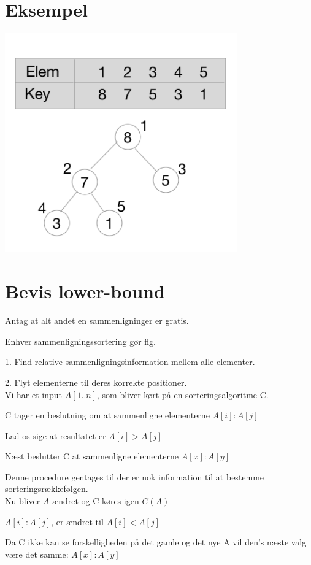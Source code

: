\documentclass[]{article}
\begin{document}
{\newpage
\section*{Eksempel}
\includegraphics[width=10cm]{graphics/Heapsort Example.png}
\newpage

\section*{Bevis lower-bound}

Antag at alt andet en sammenligninger er gratis.

Enhver sammenligningssortering gør flg.

1. Find relative sammenligningsinformation mellem alle elementer.

2. Flyt elementerne til deres korrekte positioner.\\

Vi har et input $A[1..n]$, som bliver kørt på en sorteringsalgoritme C.

C tager en beslutning om at sammenligne elementerne $A[i]:A[j]$

Lad os sige at resultatet er $A[i] > A[j]$

Næst beslutter C at sammenligne elementerne $A[x] : A[y]$

Denne procedure gentages til der er nok information til at bestemme sorteringsrækkefølgen.\\

Nu bliver $A$ ændret og C køres igen $C(A)$

$A[i] : A[j]$, er ændret til $A[i] < A[j]$

Da C ikke kan se forskelligheden på det gamle og det nye A vil den's næste valg være det samme: $A[x] : A[y]$\\

}
\end{document}
